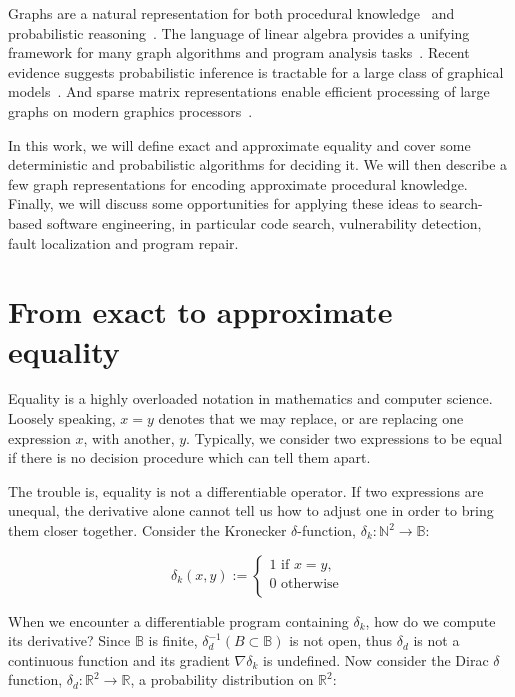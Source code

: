 \documentclass[11pt]{article}
\begin{document}
    Graphs are a natural representation for both procedural knowledge~\citep{allamanis2017learning} and probabilistic reasoning~\citep{pearl2014probabilistic}. The language of linear algebra provides a unifying framework for many graph algorithms and program analysis tasks~\citep{kepner2011graph}. Recent evidence suggests probabilistic inference is tractable for a large class of graphical models~\citep{choi2020probabilistic}. And sparse matrix representations enable efficient processing of large graphs on modern graphics processors~\citep{kepner2016mathematical}.

    In this work, we will define exact and approximate equality and cover some deterministic and probabilistic algorithms for deciding it. We will then describe a few graph representations for encoding approximate procedural knowledge. Finally, we will discuss some opportunities for applying these ideas to search-based software engineering, in particular code search, vulnerability detection, fault localization and program repair.


    \section{From exact to approximate equality}\label{sec:definitions}

    Equality is a highly overloaded notation in mathematics and computer science. Loosely speaking, $x = y$ denotes that we may replace, or are replacing one expression $x$, with another, $y$. Typically, we consider two expressions to be equal if there is no decision procedure which can tell them apart.

    The trouble is, equality is not a differentiable operator. If two expressions are unequal, the derivative alone cannot tell us how to adjust one in order to bring them closer together. Consider the Kronecker $\delta$-function, $\delta_k: \mathbb{N}^2\rightarrow \mathbb{B}$:

    $$
    \delta_k(x, y) :=
    \begin{cases}
        1 \text{ if } x = y, \\
        0 \text{ otherwise }\\
    \end{cases}
    $$

    When we encounter a differentiable program containing $\delta_k$, how do we compute its derivative? Since $\mathbb{B}$ is finite, $\delta_d^{-1}(B\subset \mathbb{B})$ is not open, thus $\delta_d$ is not a continuous function and its gradient $\nabla\delta_k$ is undefined. Now consider the Dirac $\delta$ function, $\delta_d: \mathbb{R}^2 \rightarrow \mathbb{R}$, a probability distribution on $\mathbb{R}^2$:
\end{document}

